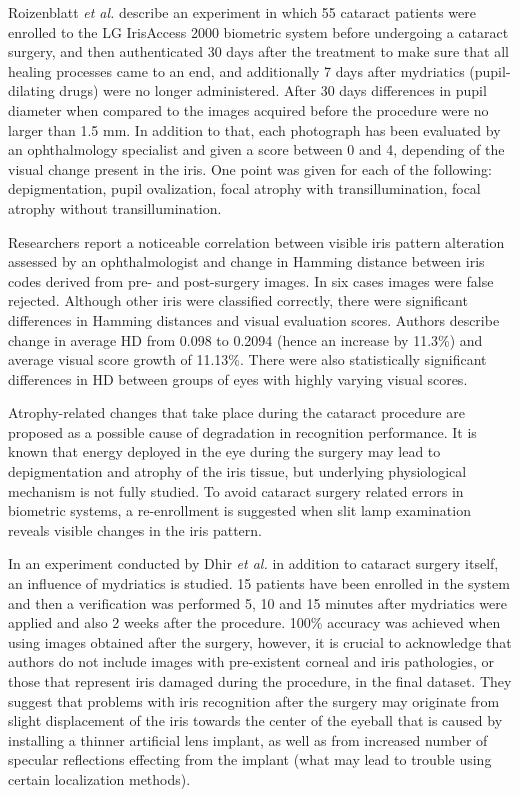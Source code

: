 \documentclass[a4paper]{spie}
\begin{document}
Roizenblatt \emph{et al.} \cite{Roizenblatt} describe an experiment in which 55 cataract patients were enrolled to the LG IrisAccess 2000 biometric system before undergoing a cataract surgery, and then authenticated 30 days after the treatment to make sure that all healing processes came to an end, and additionally 7 days after mydriatics (pupil-dilating drugs) were no longer administered. After 30 days differences in pupil diameter when compared to the images acquired before the procedure were no larger than 1.5 mm. In addition to that, each photograph has been evaluated by an ophthalmology specialist and given a score between 0 and 4, depending of the visual change present in the iris. One point was given for each of the following: depigmentation, pupil ovalization, focal atrophy with transillumination, focal atrophy without transillumination.

Researchers report a noticeable correlation between visible iris pattern alteration assessed by an ophthalmologist and change in Hamming distance between iris codes derived from pre- and post-surgery images. In six cases images were false rejected. Although other iris were classified correctly, there were significant differences in Hamming distances and visual evaluation scores. Authors describe change in average HD from 0.098 to 0.2094 (hence an increase by 11.3\%) and average visual score growth of 11.13\%. There were also statistically significant differences in HD between groups of eyes with highly varying visual scores.

Atrophy-related changes that take place during the cataract procedure are proposed as a possible cause of degradation in recognition performance. It is known that energy deployed in the eye during the surgery may lead to depigmentation and atrophy of the iris tissue, but underlying physiological mechanism is not fully studied. To avoid cataract surgery related errors in biometric systems, a re-enrollment is suggested when slit lamp examination reveals visible changes in the iris pattern.

In an experiment conducted by Dhir \emph{et al.} \cite{Dhir} in addition to cataract surgery itself, an influence of mydriatics is studied. 15 patients have been enrolled in the system and then a verification was performed 5, 10 and 15 minutes after mydriatics were applied and also 2 weeks after the procedure. 100\% accuracy was achieved when using images obtained after the surgery, however, it is crucial to acknowledge that authors do not include images with pre-existent corneal and iris pathologies, or those that represent iris damaged during the procedure, in the final dataset. They suggest that problems with iris recognition after the surgery may originate from slight displacement of the iris towards the center of the eyeball that is caused by installing a thinner artificial lens implant, as well as from increased number of specular reflections effecting from the implant (what may lead to trouble using certain localization methods).
\end{document}
